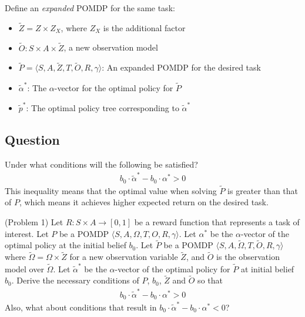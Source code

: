 \documentclass{article}
\newcommand{\td}[1]{\tilde{#1}}
\begin{document}
\noindent Define an \emph{expanded} POMDP for the same task:
\begin{itemize}
\item $\td{Z} = Z\times Z_X$, where $Z_X$ is the additional factor
\item $\td{O}: S\times A\times\td{Z}$, a new observation model
\item $\td{P}=\langle S,A,\td{Z},T,\td{O},R,\gamma  \rangle$: An expanded POMDP for the desired task
\item $\td{\alpha}^*$: The $\alpha$-vector for the optimal policy for $\td{P}$
\item $\td{p}^*$: The optimal policy tree corresponding to $\td{\alpha}^*$
\end{itemize}

\subsection{Question}
Under what conditions will the following be satisfied?
\begin{align}
b_0\cdot \td{\alpha}^* - b_0\cdot \alpha^* > 0
\end{align}
This inequality means that the optimal value when solving $\td{P}$ is greater than that of $P$, which means it achieves higher expected return on the desired task.


\begin{definition}(Problem 1)
Let $R:S\times A\rightarrow [0,1]$ be a reward function that represents a
task of interest.
Let $P$ be a POMDP $\langle S, A, \Omega, T, O, R, \gamma  \rangle$. Let $\alpha^*$ be the $\alpha$-vector of the optimal policy at the initial belief $b_0$. Let $\td{P}$ be a POMDP $\langle S, A, \td{\Omega}, T, \td{O}, R, \gamma  \rangle$ where $\td{\Omega}=\Omega\times\td{Z}$ for a new observation variable $\td{Z}$, and $\td{O}$ is the observation model over $\td{\Omega}$. Let $\td{\alpha}^*$ be the $\alpha$-vector of the optimal policy for $\td{P}$ at initial belief $b_0$. Derive the necessary conditions of $P$, $b_0$, $\td{Z}$ and $\td{O}$ so that
\begin{align}
b_0\cdot \td{\alpha}^* - b_0\cdot \alpha^* > 0
\end{align}
Also, what about conditions that result in $b_0\cdot \td{\alpha}^* - b_0\cdot \alpha^* < 0$?
\end{definition}
\end{document}
